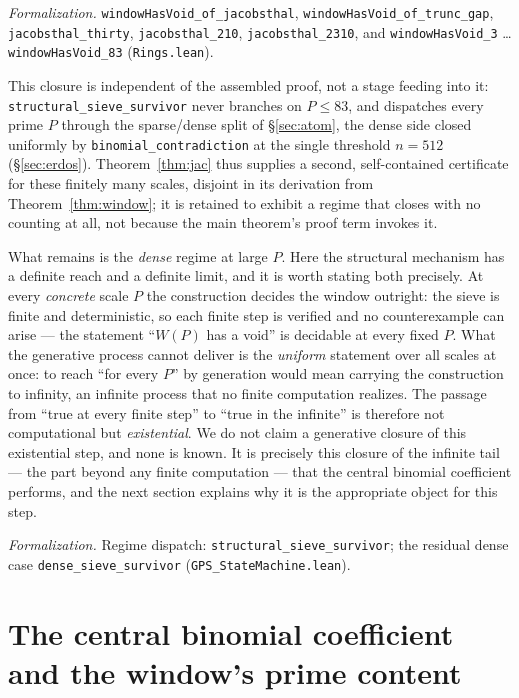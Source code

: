 \documentclass[11pt,a4paper]{amsart}
\theoremstyle{plain}
\theoremstyle{definition}
\theoremstyle{plain}
\theoremstyle{remark}
\newcommand{\lean}[1]{\textup{\texttt{#1}}}
\newcommand{\Formal}[1]{\par\smallskip\noindent\emph{Formalization.} #1\par\smallskip}
\begin{document}
\Formal{\lean{windowHasVoid\_of\_jacobsthal}, \lean{windowHasVoid\_of\_trunc\_gap},
\lean{jacobsthal\_thirty}, \lean{jacobsthal\_210}, \lean{jacobsthal\_2310}, and
\lean{windowHasVoid\_3} \dots \lean{windowHasVoid\_83} (\lean{Rings.lean}).}

This closure is independent of the assembled proof, not a stage feeding into it:
\lean{structural\_sieve\_survivor} never branches on $P\le83$, and dispatches every
prime $P$ through the sparse/dense split of \S\ref{sec:atom}, the dense side closed
uniformly by \lean{binomial\_contradiction} at the single threshold $n=512$
(\S\ref{sec:erdos}). Theorem~\ref{thm:jac} thus supplies a second, self-contained
certificate for these finitely many scales, disjoint in its derivation from
Theorem~\ref{thm:window}; it is retained to exhibit a regime that closes with no
counting at all, not because the main theorem's proof term invokes it.

What remains is the \emph{dense} regime at large $P$. Here the structural mechanism has a
definite reach and a definite limit, and it is worth stating both precisely. At every
\emph{concrete} scale $P$ the construction decides the window outright: the sieve is
finite and deterministic, so each finite step is verified and no counterexample can arise
--- the statement \enquote{$W(P)$ has a void} is decidable at every fixed $P$. What the
generative process cannot deliver is the \emph{uniform} statement over all scales at once:
to reach \enquote{for every $P$} by generation would mean carrying the construction to
infinity, an infinite process that no finite computation realizes. The passage from
\enquote{true at every finite step} to \enquote{true in the infinite} is therefore not
computational but \emph{existential}. We do not claim a generative closure of this
existential step, and none is known. It is precisely this closure of the infinite tail ---
the part beyond any finite computation --- that the central binomial coefficient performs, and
the next section explains why it is the appropriate object for this step.

\Formal{Regime dispatch: \lean{structural\_sieve\_survivor}; the residual dense case
\lean{dense\_sieve\_survivor} (\lean{GPS\_StateMachine.lean}).}

\section{The central binomial coefficient and the window's prime content}
\label{sec:newton}
\end{document}
